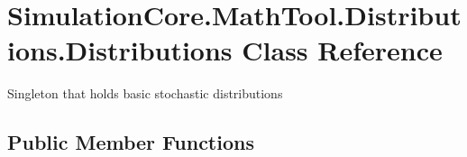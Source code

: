 \hypertarget{class_simulation_core_1_1_math_tool_1_1_distributions_1_1_distributions}{}\section{Simulation\+Core.\+Math\+Tool.\+Distributions.\+Distributions Class Reference}
\label{class_simulation_core_1_1_math_tool_1_1_distributions_1_1_distributions}


Singleton that holds basic stochastic distributions  


\subsection*{Public Member Functions}
